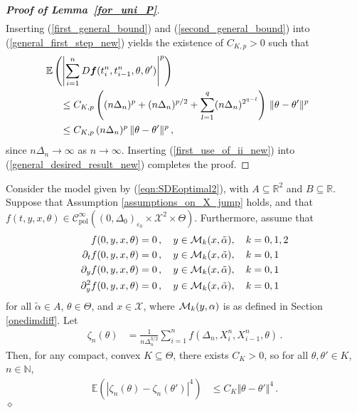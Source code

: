 \documentclass[11pt,a4paper]{article}
\newcommand{\xtl}{{X^n_{i-1}}}
\newcommand{\xtr}{X^n_i}
\newcommand{\tminus}{{t_{i-1}^n}}
\newcommand{\tplus}{{t_i^n}}
\newcommand{\EE}{{\mathbb E}}
\newcommand{\RR}{{\mathbb R}}
\newcommand{\NN}{{\mathbb N}}
\newcommand{\cc}{{\mathcal{C}}}
\newcommand{\xx}{{\mathcal{X}}}
\newcommand{\dqed}{{\leavevmode \unskip \penalty9999 \hbox{} \nobreak \hfill \quad \hbox{$\diamond$}}}
\numberwithin{equation}{section}
\numberwithin{theorem}{section}
\begin{document}
\begin{proof}[\textbf{Proof of Lemma~\ref{for_uni_P}}]
\begin{align}
\label{second_general_bound}
\end{align}
%
Inserting (\ref{first_general_bound}) and (\ref{second_general_bound})
into (\ref{general_first_step_new}) yields the existence of
$C_{K,p}>0$ such that
\begin{align}
&\hspace{-5mm} \EE\left( \left| \sum_{i=1}^n D\bm{f}(\tplus,\tminus,\theta,\theta') \right|^p\right)\nonumber\\
&\leq C_{K,p}\left(  (n\Delta_n)^{p} +
  (n\Delta_n)^{p/2} + \sum_{l=1}^q
  (n\Delta_n)^{2^{q-l}} \right) \, \Vert
  \theta-\theta'\Vert^p \nonumber\\
&\leq  C_{K,p}\,(n\Delta_n)^{p}\, \Vert
  \theta-\theta'\Vert^p\,,\label{first_use_of_ii_new}
\end{align}
%
since $n\Delta_n \to \infty$ as $n\to \infty$. Inserting
(\ref{first_use_of_ii_new}) into
(\ref{general_desired_result_new}) completes the proof.
\end{proof}
%
\begin{lemma}
Consider the model given by (\ref{eqn:SDEoptimal2}), with $A\subseteq \RR^2$ and $B\subseteq \RR$. Suppose that Assumption
\ref{assumptions_on_X_jump} holds, and that $f(t,y,x, \theta) \in
\cc^\infty_\text{pol}((0,\Delta_0)_{\varepsilon_0} \times \xx^2 \times
\Theta)$. Furthermore, assume that
\begin{align*}
f(0,y,x, \theta) &=0\,, \quad y \in {\cal M}_k(x,\tilde \alpha), \quad k=0,1,2\\
\partial_t f(0,y,x, \theta) &=0\,,\quad y \in {\cal M}_k(x,\tilde \alpha), \quad 
                                                           k=0,1\\
\partial_y f(0,y,x, \theta) &=0\,,\quad y \in {\cal M}_k(x,\tilde \alpha), \quad 
                                                           k=0,1\\
\partial_y^2 f(0,y,x, \theta) &=0\,,\quad y \in {\cal M}_k(x,\tilde
                                \alpha), \quad  k=0,1
\end{align*}
for all $\tilde \alpha \in A$, $\theta \in \Theta$, and $x\in \xx$,
where ${\cal M}_k(y,\alpha)$ is as defined in Section \ref{onedimdiff}.
%
Let 
\begin{align*}
\zeta_n(\theta) &= \frac{1}{n\Delta_n^{3/2}} \sum_{i=1}^n f(\Delta_n, \xtr, \xtl, \theta)\,.
\end{align*}
%
Then, for any compact, convex $K\subseteq \Theta$, there exists
$C_{K}>0$, so for all $\theta, \theta' \in K$, $n \in \NN$,
\begin{align*}
\EE\left( |\zeta_n(\theta)-\zeta_n(\theta')|^4\right) &\leq C_{K} \Vert \theta-\theta' \Vert^4\,.
\end{align*}
%
\dqed
\label{for_uni_P_alpha4}
\end{lemma}
\end{document}
